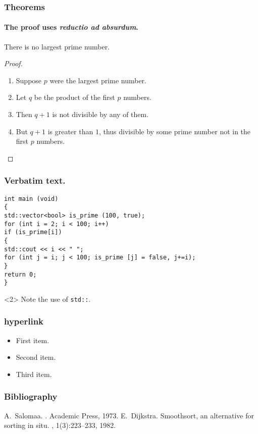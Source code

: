\documentclass[hyperref=unicode]{beamer}
\begin{document}
\begin{frame}
\frametitle{Theorems}

\framesubtitle{The proof uses \textit{reductio ad absurdum}.}
\begin{theorem}
There is no largest prime number.
\end{theorem}
\begin{proof}
\begin{enumerate}[<+-| alert@+>]
\item Suppose $p$ were the largest prime number.
\item Let $q$ be the product of the first $p$ numbers.
\item Then $q+1$ is not divisible by any of them.
\item But $q + 1$ is greater than $1$, thus divisible by some prime
number not in the first $p$ numbers.\qedhere
\end{enumerate}
\end{proof}

\end{frame}



\begin{frame}[fragile]

\frametitle{Verbatim text.}


\begin{verbatim}
int main (void)
{
std::vector<bool> is_prime (100, true);
for (int i = 2; i < 100; i++)
if (is_prime[i])
{
std::cout << i << " ";
for (int j = i; j < 100; is_prime [j] = false, j+=i);
}
return 0;
}
\end{verbatim}
\begin{uncoverenv}<2>
Note the use of \verb|std::|.
\end{uncoverenv}

\end{frame}

\begin{frame}
\frametitle{hyperlink}
\begin{itemize}
\item<1-> First item.
\item<2-> Second item.
\item<3-> Third item.
\end{itemize}
\hyperlink{jumptosecond}{}
\hypertarget<2>{jumptosecond}{}
\end{frame}

\begin{frame}
\frametitle{Bibliography}
\begin{thebibliography}{Dijkstra, 1982}
A.~Salomaa.
.
\newblock Academic Press, 1973.
E.~Dijkstra.
\newblock Smoothsort, an alternative for sorting in situ.
, 1(3):223--233, 1982.
\end{thebibliography}
\end{frame}
\end{document}
